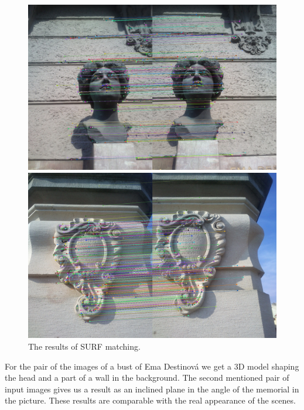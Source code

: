 \begin{figure}[h]
\centerline{
\includegraphics[width=12.0cm]{img/ema_matching.png}}
\centerline{
\includegraphics[width=12.0cm]{img/memorial_matching.png}}
\caption{The results of SURF matching.}
\label{fig:matching}
\end{figure}

For the pair of the images of a bust of Ema Destinová we get a 3D model shaping the head and a part of a wall in the background.
The second mentioned pair of input images gives us a result as an inclined plane in the angle of the memorial in the picture.
These results are comparable with the real appearance of the scenes.

